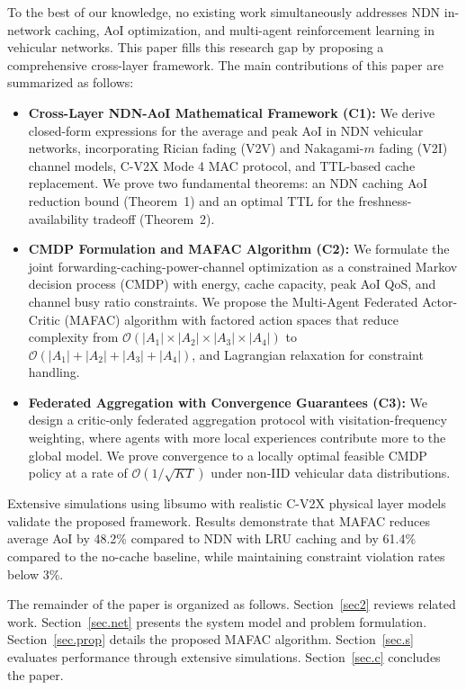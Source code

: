 \documentclass[journal]{IEEEtran}
\begin{document}
To the best of our knowledge, no existing work simultaneously addresses NDN in-network caching, AoI optimization, and multi-agent reinforcement learning in vehicular networks. This paper fills this research gap by proposing a comprehensive cross-layer framework. The main contributions of this paper are summarized as follows:

\begin{itemize}
\item \textbf{Cross-Layer NDN-AoI Mathematical Framework (C1):} We derive closed-form expressions for the average and peak AoI in NDN vehicular networks, incorporating Rician fading (V2V) and Nakagami-$m$ fading (V2I) channel models, C-V2X Mode 4 MAC protocol, and TTL-based cache replacement. We prove two fundamental theorems: an NDN caching AoI reduction bound (Theorem~1) and an optimal TTL for the freshness-availability tradeoff (Theorem~2).

\item \textbf{CMDP Formulation and MAFAC Algorithm (C2):} We formulate the joint forwarding-caching-power-channel optimization as a constrained Markov decision process (CMDP) with energy, cache capacity, peak AoI QoS, and channel busy ratio constraints. We propose the Multi-Agent Federated Actor-Critic (MAFAC) algorithm with factored action spaces that reduce complexity from $\mathcal{O}(|A_1| \times |A_2| \times |A_3| \times |A_4|)$ to $\mathcal{O}(|A_1| + |A_2| + |A_3| + |A_4|)$, and Lagrangian relaxation for constraint handling.

\item \textbf{Federated Aggregation with Convergence Guarantees (C3):} We design a critic-only federated aggregation protocol with visitation-frequency weighting, where agents with more local experiences contribute more to the global model. We prove convergence to a locally optimal feasible CMDP policy at a rate of $\mathcal{O}(1/\sqrt{KT})$ under non-IID vehicular data distributions.
\end{itemize}

Extensive simulations using libsumo with realistic C-V2X physical layer models validate the proposed framework. Results demonstrate that MAFAC reduces average AoI by 48.2\% compared to NDN with LRU caching and by 61.4\% compared to the no-cache baseline, while maintaining constraint violation rates below 3\%.

The remainder of the paper is organized as follows. Section~\ref{sec2} reviews related work. Section~\ref{sec.net} presents the system model and problem formulation. Section~\ref{sec.prop} details the proposed MAFAC algorithm. Section~\ref{sec.s} evaluates performance through extensive simulations. Section~\ref{sec.c} concludes the paper.
\end{document}
